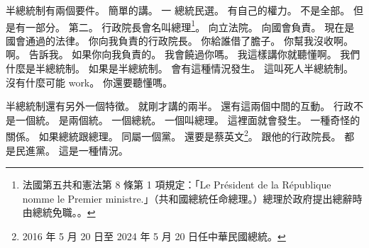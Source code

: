 \hypertarget{c01:cue:1171}{}半總統制有兩個要件。
\hypertarget{c01:cue:1172}{}簡單的講。
\hypertarget{c01:cue:1173}{}一 總統民選。
\hypertarget{c01:cue:1174}{}有自己的權力。
\hypertarget{c01:cue:1175}{}不是全部。
\hypertarget{c01:cue:1176}{}但是有一部分。
\hypertarget{c01:cue:1177}{}第二。
\hypertarget{c01:cue:1178}{}行政院長會名叫總理\footnote{法國第五共和憲法第 8 條第 1 項規定：「Le Président de la République nomme le Premier ministre.」（共和國總統任命總理。）總理於政府提出總辭時由總統免職。\cite{const1958}。}。
\hypertarget{c01:cue:1179}{}向立法院。
\hypertarget{c01:cue:1180}{}向國會負責。
\hypertarget{c01:cue:1181}{}現在是國會通過的法律。
\hypertarget{c01:cue:1182}{}你向我負責的行政院長。
\hypertarget{c01:cue:1183}{}你給誰借了膽子。
\hypertarget{c01:cue:1184}{}你幫我沒收啊。
\hypertarget{c01:cue:1185}{}啊。
\hypertarget{c01:cue:1186}{}告訴我。
\hypertarget{c01:cue:1187}{}如果你向我負責的。
\hypertarget{c01:cue:1188}{}我會饒過你嗎。
\hypertarget{c01:cue:1189}{}我這樣講你就聽懂啊。
\hypertarget{c01:cue:1190}{}我們什麼是半總統制。
\hypertarget{c01:cue:1191}{}如果是半總統制。
\hypertarget{c01:cue:1192}{}會有這種情況發生。
\hypertarget{c01:cue:1193}{}這叫死人半總統制。
\hypertarget{c01:cue:1194}{}沒有什麼可能 work。
\hypertarget{c01:cue:1195}{}你還要聽懂嗎。

\hypertarget{c01:cue:1196}{}半總統制還有另外一個特徵。
\hypertarget{c01:cue:1197}{}就剛才講的兩半。
\hypertarget{c01:cue:1198}{}還有這兩個中間的互動。
\hypertarget{c01:cue:1199}{}行政不是一個統。
\hypertarget{c01:cue:1200}{}是兩個統。
\hypertarget{c01:cue:1201}{}一個總統。
\hypertarget{c01:cue:1202}{}一個叫總理。
\hypertarget{c01:cue:1203}{}這裡面就會發生。
\hypertarget{c01:cue:1204}{}一種奇怪的關係。
\hypertarget{c01:cue:1205}{}如果總統跟總理。
\hypertarget{c01:cue:1206}{}同屬一個黨。
\hypertarget{c01:cue:1207}{}還要是蔡英文\footnote{2016 年 5 月 20 日至 2024 年 5 月 20 日任中華民國總統。}。
\hypertarget{c01:cue:1208}{}跟他的行政院長。
\hypertarget{c01:cue:1209}{}都是民進黨。
\hypertarget{c01:cue:1210}{}這是一種情況。


